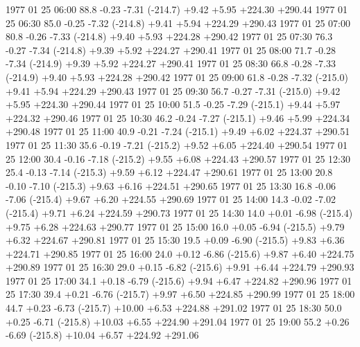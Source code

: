 \documentclass[11pt,noabs,nolof]{starlink}
\newenvironment{verysmall}{\begin{scriptsize}}{\end{scriptsize}}
\begin{document}
\begin{verysmall}
\begin{terminalv}
1977 01 25 06:00    88.8    -0.23     -7.31 (-214.7)      +9.42     +5.95     +224.30      +290.44
1977 01 25 06:30    85.0    -0.25     -7.32 (-214.8)      +9.41     +5.94     +224.29      +290.43
1977 01 25 07:00    80.8    -0.26     -7.33 (-214.8)      +9.40     +5.93     +224.28      +290.42
1977 01 25 07:30    76.3    -0.27     -7.34 (-214.8)      +9.39     +5.92     +224.27      +290.41
1977 01 25 08:00    71.7    -0.28     -7.34 (-214.9)      +9.39     +5.92     +224.27      +290.41
1977 01 25 08:30    66.8    -0.28     -7.33 (-214.9)      +9.40     +5.93     +224.28      +290.42
1977 01 25 09:00    61.8    -0.28     -7.32 (-215.0)      +9.41     +5.94     +224.29      +290.43
1977 01 25 09:30    56.7    -0.27     -7.31 (-215.0)      +9.42     +5.95     +224.30      +290.44
1977 01 25 10:00    51.5    -0.25     -7.29 (-215.1)      +9.44     +5.97     +224.32      +290.46
1977 01 25 10:30    46.2    -0.24     -7.27 (-215.1)      +9.46     +5.99     +224.34      +290.48
1977 01 25 11:00    40.9    -0.21     -7.24 (-215.1)      +9.49     +6.02     +224.37      +290.51
1977 01 25 11:30    35.6    -0.19     -7.21 (-215.2)      +9.52     +6.05     +224.40      +290.54
1977 01 25 12:00    30.4    -0.16     -7.18 (-215.2)      +9.55     +6.08     +224.43      +290.57
1977 01 25 12:30    25.4    -0.13     -7.14 (-215.3)      +9.59     +6.12     +224.47      +290.61
1977 01 25 13:00    20.8    -0.10     -7.10 (-215.3)      +9.63     +6.16     +224.51      +290.65
1977 01 25 13:30    16.8    -0.06     -7.06 (-215.4)      +9.67     +6.20     +224.55      +290.69
1977 01 25 14:00    14.3    -0.02     -7.02 (-215.4)      +9.71     +6.24     +224.59      +290.73
1977 01 25 14:30    14.0    +0.01     -6.98 (-215.4)      +9.75     +6.28     +224.63      +290.77
1977 01 25 15:00    16.0    +0.05     -6.94 (-215.5)      +9.79     +6.32     +224.67      +290.81
1977 01 25 15:30    19.5    +0.09     -6.90 (-215.5)      +9.83     +6.36     +224.71      +290.85
1977 01 25 16:00    24.0    +0.12     -6.86 (-215.6)      +9.87     +6.40     +224.75      +290.89
1977 01 25 16:30    29.0    +0.15     -6.82 (-215.6)      +9.91     +6.44     +224.79      +290.93
1977 01 25 17:00    34.1    +0.18     -6.79 (-215.6)      +9.94     +6.47     +224.82      +290.96
1977 01 25 17:30    39.4    +0.21     -6.76 (-215.7)      +9.97     +6.50     +224.85      +290.99
1977 01 25 18:00    44.7    +0.23     -6.73 (-215.7)     +10.00     +6.53     +224.88      +291.02
1977 01 25 18:30    50.0    +0.25     -6.71 (-215.8)     +10.03     +6.55     +224.90      +291.04
1977 01 25 19:00    55.2    +0.26     -6.69 (-215.8)     +10.04     +6.57     +224.92      +291.06

\end{terminalv}
\end{verysmall}
\end{document}
